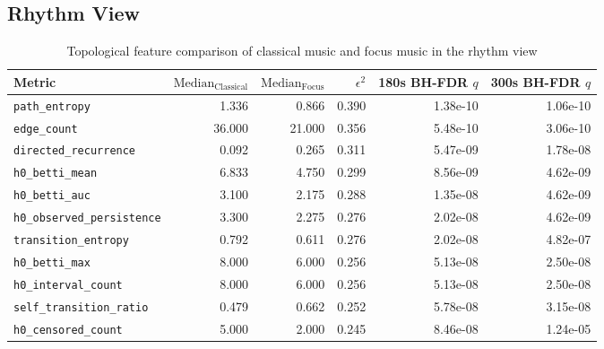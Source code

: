 \documentclass{article}
\begin{document}
\clearpage
\subsection{Rhythm View}

\begin{table}[htbp]
\centering
\caption{Topological feature comparison of classical music and focus music in the rhythm view}
\label{tab:rhythm_topology}
\renewcommand{\arraystretch}{1.5}
\begin{tabular}{lrrrrr}
\toprule
Metric                    & $\text{Median}_{\text{Classical}}$ & $\text{Median}_{\text{Focus}}$ & $\epsilon^2$ & 180s BH-FDR $q$ & 300s BH-FDR $q$ \\
\midrule
\rowcolor{green!15}\verb|path_entropy|            &            1.336 &             0.866 &        0.390 &  1.38e-10 &  1.06e-10 \\
\rowcolor{green!15}\verb|edge_count|              &           36.000 &            21.000 &        0.356 &  5.48e-10 &  3.06e-10 \\
\rowcolor{green!15}\verb|directed_recurrence|     &            0.092 &             0.265 &        0.311 &  5.47e-09 &  1.78e-08 \\
\rowcolor{green!15}\verb|h0_betti_mean|           &            6.833 &             4.750 &        0.299 &  8.56e-09 &  4.62e-09 \\
\rowcolor{green!15}\verb|h0_betti_auc|            &            3.100 &             2.175 &        0.288 &  1.35e-08 &  4.62e-09 \\
\rowcolor{green!15}\verb|h0_observed_persistence| &            3.300 &             2.275 &        0.276 &  2.02e-08 &  4.62e-09 \\
\rowcolor{green!15}\verb|transition_entropy|      &            0.792 &             0.611 &        0.276 &  2.02e-08 &  4.82e-07 \\
\rowcolor{green!15}\verb|h0_betti_max|            &            8.000 &             6.000 &        0.256 &  5.13e-08 &  2.50e-08 \\
\rowcolor{green!15}\verb|h0_interval_count|       &            8.000 &             6.000 &        0.256 &  5.13e-08 &  2.50e-08 \\
\rowcolor{green!15}\verb|self_transition_ratio|   &            0.479 &             0.662 &        0.252 &  5.78e-08 &  3.15e-08 \\
\rowcolor{green!15}\verb|h0_censored_count|       &            5.000 &             2.000 &        0.245 &  8.46e-08 &  1.24e-05 \\

\end{tabular}
\end{table}
\end{document}

